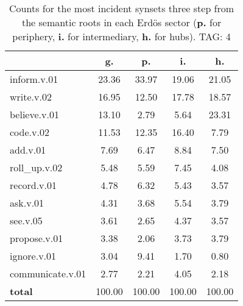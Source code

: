 \begin{table}[h!]
\begin{center}
\begin{tabular}{| l | c | c | c | c |}\hline
 & g. & p. & i. & h. \\\hline
inform.v.01 & 23.36  & 33.97  & 19.06  & 21.05 \\\hline
write.v.02 & 16.95  & 12.50  & 17.78  & 18.57 \\\hline
believe.v.01 & 13.10  & 2.79  & 5.64  & 23.31 \\\hline
code.v.02 & 11.53  & 12.35  & 16.40  & 7.79 \\\hline
add.v.01 & 7.69  & 6.47  & 8.84  & 7.50 \\\hline
roll\_up.v.02 & 5.48  & 5.59  & 7.45  & 4.08 \\\hline
record.v.01 & 4.78  & 6.32  & 5.43  & 3.57 \\\hline
ask.v.01 & 4.31  & 3.68  & 5.54  & 3.79 \\\hline
see.v.05 & 3.61  & 2.65  & 4.37  & 3.57 \\\hline
propose.v.01 & 3.38  & 2.06  & 3.73  & 3.79 \\\hline
ignore.v.01 & 3.04  & 9.41  & 1.70  & 0.80 \\\hline
communicate.v.01 & 2.77  & 2.21  & 4.05  & 2.18 \\\hline
{{\bf total}} & 100.00  & 100.00  & 100.00  & 100.00 \\\hline
\end{tabular}
\caption{Counts for the most incident synsets three step from the semantic roots in each Erd\"os sector ({\bf p.} for periphery, {\bf i.} for intermediary, {\bf h.} for hubs). TAG: 4}
\end{center}
\end{table}